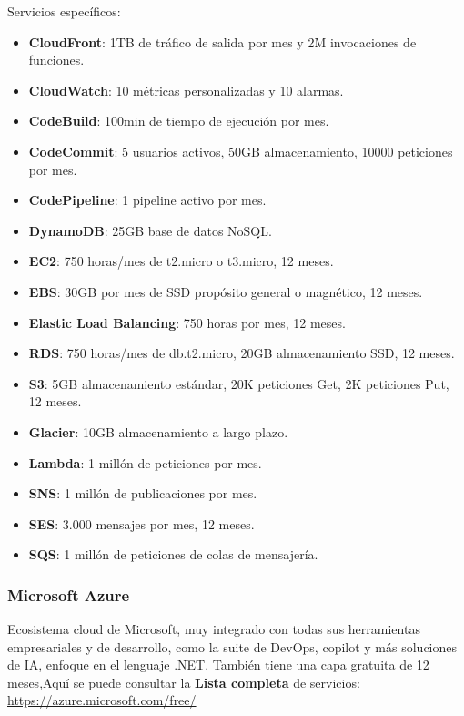 Servicios específicos:
\begin{itemize}
	\item \textbf{CloudFront}: 1TB de tráfico de salida por mes y 2M invocaciones de funciones.
	\item \textbf{CloudWatch}: 10 métricas personalizadas y 10 alarmas.
	\item \textbf{CodeBuild}: 100min de tiempo de ejecución por mes.
	\item \textbf{CodeCommit}: 5 usuarios activos, 50GB almacenamiento, 10000 peticiones por mes.
	\item \textbf{CodePipeline}: 1 pipeline activo por mes.
	\item \textbf{DynamoDB}: 25GB base de datos NoSQL.
	\item \textbf{EC2}: 750 horas/mes de t2.micro o t3.micro, 12 meses.
	\item \textbf{EBS}: 30GB por mes de SSD propósito general o magnético, 12 meses.
	\item \textbf{Elastic Load Balancing}: 750 horas por mes, 12 meses.
	\item \textbf{RDS}: 750 horas/mes de db.t2.micro, 20GB almacenamiento SSD, 12 meses.
	\item \textbf{S3}: 5GB almacenamiento estándar, 20K peticiones Get, 2K peticiones Put, 12 meses.
	\item \textbf{Glacier}: 10GB almacenamiento a largo plazo.
	\item \textbf{Lambda}: 1 millón de peticiones por mes.
	\item \textbf{SNS}: 1 millón de publicaciones por mes.
	\item \textbf{SES}: 3.000 mensajes por mes, 12 meses.
	\item \textbf{SQS}: 1 millón de peticiones de colas de mensajería.
\end{itemize}

\subsubsection*{Microsoft Azure}

Ecosistema cloud de Microsoft, muy integrado con todas sus herramientas empresariales y de desarrollo, como la suite de DevOps, copilot y más soluciones de IA, enfoque en el lenguaje .NET. También tiene una capa gratuita de 12 meses,Aquí se puede consultar la \textbf{Lista completa} de servicios: \url{https://azure.microsoft.com/free/}

